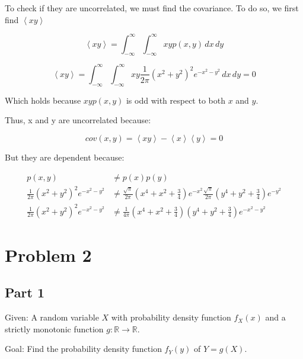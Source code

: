 \documentclass{article}
\begin{document}
To check if they are uncorrelated, we must find the covariance. To do so, we first find $\left\langle xy \right\rangle$

\begin{equation*}    
\left\langle xy \right\rangle =  \int _{-\infty }^{\infty } \int _{-\infty }^{\infty } xy p(x,y) \,dx \,dy 
\end{equation*}


\begin{equation*}    
\left\langle xy \right\rangle =  \int _{-\infty }^{\infty } \int _{-\infty }^{\infty } xy \frac{1}{2\pi} (x^2+y^2)^2 e^{-x^2-y^2} \,dx \,dy = 0
\end{equation*}

Which holds because $xyp(x,y)$ is odd with respect to both $x$ and $y$. 

Thus, x and y are uncorrelated because:

\begin{equation*}    
cov(x,y) = \left\langle xy \right\rangle - \left\langle x \right\rangle \left\langle y \right\rangle = 0 
\end{equation*}

But they are dependent because:

\begin{equation*}    
\begin{aligned}    
p(x,y) &\neq p(x) p(y)  \\
\frac{1}{2\pi} (x^2+y^2)^2 e^{-x^2-y^2} &\neq \frac{\sqrt{\pi}}{2\pi} (x^4+x^2 +\frac{3}{4} ) e^{-x^2}    \frac{\sqrt{\pi}}{2\pi} (y^4+y^2 +\frac{3}{4} ) e^{-y^2} \\
\frac{1}{2\pi} (x^2+y^2)^2 e^{-x^2-y^2} &\neq \frac{1}{4\pi} (x^4+x^2 +\frac{3}{4} )  (y^4+y^2 +\frac{3}{4} )  e^{-x^2-y^2}
\end{aligned}
\end{equation*}

\section*{Problem 2}
\subsection*{Part 1}
Given: A random variable \( X \) with probability density function \( f_X(x) \) and a strictly monotonic function \( g: \mathbb{R} \to \mathbb{R} \).

Goal: Find the probability density function \( f_Y(y) \) of \( Y = g(X) \).
\end{document}
